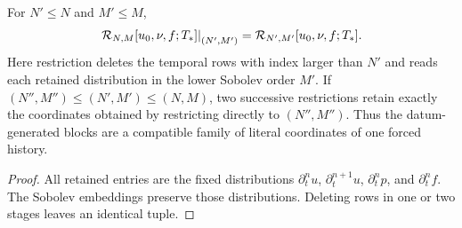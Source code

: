 \begin{proposition}
\label{f:prop:rectangle-compatibility}
For \(N'\le N\) and \(M'\le M\),
\begin{equation}
 \left.\mathcal R_{N,M}[u_0,\nu,f;T_*]\right|_{(N',M')}
 =\mathcal R_{N',M'}[u_0,\nu,f;T_*].
 \label{f:eq:rectangle-compatibility}
\end{equation}
Here restriction deletes the temporal rows with index larger than \(N'\) and
reads each retained distribution in the lower Sobolev order \(M'\).  If
\((N'',M'')\le(N',M')\le(N,M)\), two successive restrictions retain exactly
the coordinates obtained by restricting directly to \((N'',M'')\).  Thus the
datum-generated blocks are a compatible family of literal coordinates of one forced history.
\end{proposition}

\begin{proof}
All retained entries are the fixed distributions
\(\partial_t^nu\), \(\partial_t^{n+1}u\), \(\partial_t^np\), and
\(\partial_t^nf\).
The Sobolev embeddings preserve those distributions.  Deleting rows in one
or two stages leaves an identical tuple.
\end{proof}

